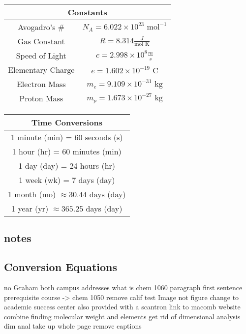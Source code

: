 \documentclass[10pt, roman]{article}
\begin{document}
\noindent
\begin{minipage}{.5\textwidth}
\centering
\begin{tabular}{|c|c|}
\hline
\multicolumn{2}{|c|}{\textbf{Constants}} \\
\hline
Avogadro’s \# & $N_A = 6.022 \times 10^{23} \text{ mol}^{-1}$ \\
Gas Constant & $R = 8.314 \frac{J}{\text{mol K}}$ \\
Speed of Light & $c = 2.998 \times 10^{8} \frac{m}{s}$ \\
Elementary Charge & $e = 1.602 \times 10^{-19} \text{ C}$ \\
Electron Mass & $m_e = 9.109 \times 10^{-31} \text{ kg}$ \\
Proton Mass & $m_p = 1.673 \times 10^{-27} \text{ kg}$ \\
\hline
\end{tabular}
\end{minipage}%
\begin{minipage}{.5\textwidth}
\centering
\begin{tabular}{|c|}
\hline
\textbf{Time Conversions} \\
\hline
1 minute (min) = 60 seconds (s) \\
1 hour (hr) = 60 minutes (min) \\
1 day (day) = 24 hours (hr) \\
1 week (wk) = 7 days (day) \\
1 month (mo) $\approx 30.44$ days (day) \\
1 year (yr) $\approx 365.25$ days (day) \\
\hline
\end{tabular}
\end{minipage}

\newpage
\subsection{notes}



\subsection{Conversion Equations}

no Graham
both campus addresses
what is chem 1060 paragraph first sentence
prerequisite course -> chem 1050
remove calif test
Image not figure
change to academic success center
also provided with a scantron
link to macomb website
combine finding molecular weight and elements
get rid of dimensional analysis
dim anal take up whole page remove captions
\end{document}
